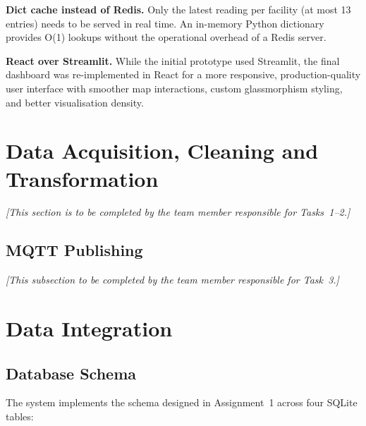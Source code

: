 \documentclass[11pt,a4paper]{article}
\begin{document}
\textbf{Dict cache instead of Redis.}
Only the latest reading per facility (at most 13 entries) needs to be served in real time. An in-memory Python dictionary provides O(1) lookups without the operational overhead of a Redis server.

\textbf{React over Streamlit.}
While the initial prototype used Streamlit, the final dashboard was re-implemented in React for a more responsive, production-quality user interface with smoother map interactions, custom glassmorphism styling, and better visualisation density.

\section{Data Acquisition, Cleaning and Transformation}

\textit{[This section is to be completed by the team member responsible for Tasks~1--2.]}

\subsection{MQTT Publishing}

\textit{[This subsection to be completed by the team member responsible for Task~3.]}

\section{Data Integration}

\subsection{Database Schema}

The system implements the schema designed in Assignment~1 across four SQLite tables:
\end{document}
